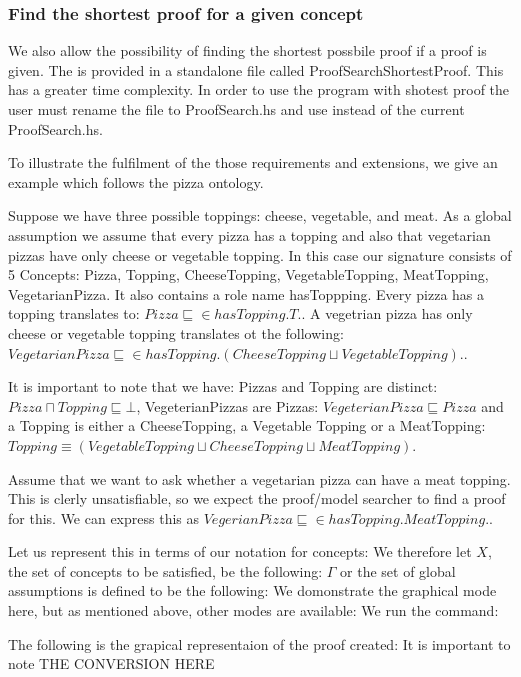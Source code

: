\subsubsection*{Find the shortest proof for a given concept}
We also allow the possibility of finding the shortest possbile proof if a proof is given. The is provided in a standalone file called ProofSearchShortestProof. This has a greater time complexity. In order to use the program with shotest proof the user must rename the file to ProofSearch.hs and use instead of the current ProofSearch.hs. 

To illustrate the fulfilment of the those requirements and extensions, we give an example which follows the pizza ontology.

Suppose we have three possible toppings: cheese, vegetable, and meat. As a global assumption we assume that every pizza has a topping and also that vegetarian pizzas have only cheese or vegetable topping.
In this case our signature consists of 5 Concepts: Pizza, Topping, CheeseTopping, VegetableTopping, MeatTopping, VegetarianPizza. It also contains a role name hasToppping.
Every pizza has a topping translates to: $Pizza \sqsubseteq \in hasTopping.T.$. A vegetrian pizza has only cheese or vegetable topping translates ot the following: $VegetarianPizza \sqsubseteq \in hasTopping.(CheeseTopping \sqcup VegetableTopping).$. 

It is important to note that we have:
Pizzas and Topping are distinct: $Pizza \sqcap Topping \sqsubseteq \bot$, VegeterianPizzas are Pizzas: $VegeterianPizza \sqsubseteq Pizza$ and a Topping is either a CheeseTopping, a Vegetable Topping or a MeatTopping: $Topping \equiv (VegetableTopping \sqcup CheeseTopping \sqcup MeatTopping)$. 

Assume that we want to ask whether a vegetarian pizza can have a meat topping. This is clerly unsatisfiable, so we expect the proof/model searcher to find a proof for this.
We can express this as $VegerianPizza \sqsubseteq \in hasTopping.MeatTopping.$.

Let us represent this in terms of our notation for concepts:
We therefore let $X$, the set of concepts to be satisfied, be the following: 
$\Gamma$ or the set of global assumptions is defined to be the following: 
We domonstrate the graphical mode here, but as mentioned above, other modes are available:
We run the command: 

The following is the grapical representaion of the proof created:
It is important to note THE CONVERSION HERE

